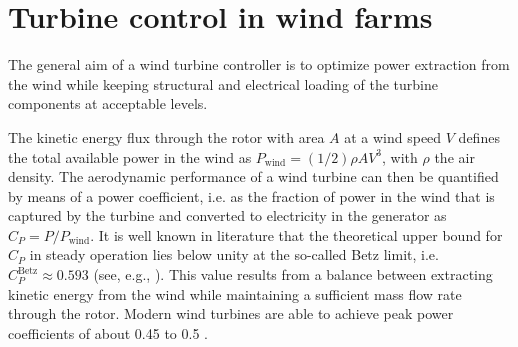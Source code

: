 %	
%
%
%

\section{Turbine control in wind farms}\label{sec:intro_control}

The general aim of a wind turbine controller is to optimize power extraction from the wind while keeping structural and electrical loading of the turbine components at acceptable levels.

The kinetic energy flux through the rotor with area $A$ at a wind speed $V$ defines the total available power in the wind as $P_{\text{wind}} =(1/2)\rho A V^3$, with $\rho$ the air density. The aerodynamic performance of a wind turbine can then be quantified by means of a power coefficient, i.e. as the fraction of power in the wind that is captured by the turbine and converted to electricity in the generator as $C_P = P/P_{\text{wind}}$. It is well known in literature that the theoretical upper bound for $C_P$ in steady operation lies below unity at the so-called Betz limit, i.e. $C_P^{\text{Betz}} \approx 0.593$ (see, e.g., \citealp{burton2001wind,hansen2015aerodynamics}). This value results from a balance between extracting kinetic energy from the wind while maintaining a sufficient mass flow rate through the rotor. Modern wind turbines are able to achieve peak power coefficients of about 0.45 to 0.5 \citep{siemens6mw, vestas3mw}.

